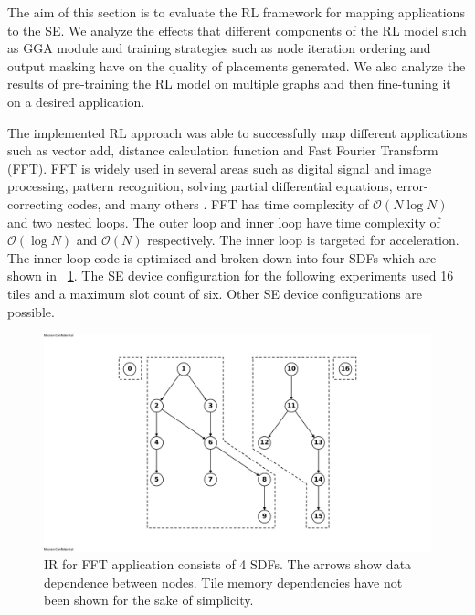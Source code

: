 
The aim of this section is to evaluate the RL framework for mapping applications to the SE.
We analyze the effects that different components of the RL model such as GGA module and training strategies such as node iteration ordering and output masking have on the quality of placements generated. We also analyze the results of pre-training the RL model on multiple graphs and then fine-tuning it on a desired application.

The implemented RL approach was able to successfully map different applications such as vector add, distance calculation function and Fast Fourier Transform (FFT). 
FFT is widely used in several areas such as digital signal and image processing, pattern recognition, solving partial differential equations, error-correcting codes, and many others \cite{814659}.
FFT has time complexity of $\mathcal{O}(N\log{N})$ and two nested loops.
The outer loop and inner loop have time complexity of $\mathcal{O}(\log{N})$ and $\mathcal{O}(N)$ respectively.
The inner loop is targeted for acceleration.
The inner loop code is optimized and broken down into four SDFs which are shown in \figurename~\ref{fig:ifft_graph}.
The SE device configuration for the following experiments used 16 tiles and a maximum slot count of six.
Other SE device configurations are possible.

\begin{figure}[tb]
  \centering
  \includegraphics[width=\linewidth]{fig/ifft_graph.pdf}
  \caption{IR for FFT application consists of 4 SDFs. The arrows show data dependence between nodes. Tile memory dependencies have not been shown for the sake of simplicity.}
  \label{fig:ifft_graph}
\end{figure}

